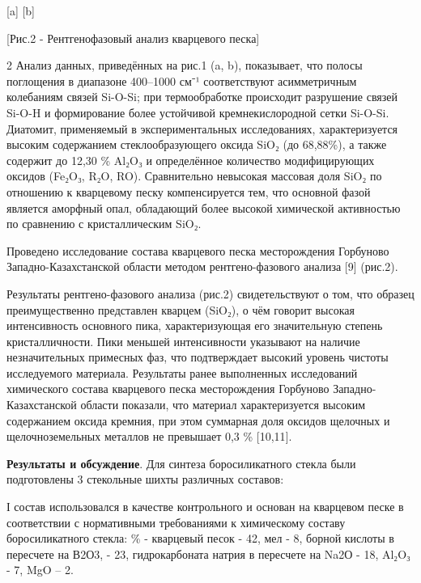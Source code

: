 \begin{figs}
    [a]
    [b]
\end{figs}
[Рис.2 - Рентгенофазовый анализ кварцевого песка]

\begin{multicols}{2}
Анализ данных, приведённых на рис.1 (a, b), показывает, что полосы
поглощения в диапазоне 400--1000 см⁻¹ соответствуют асимметричным
колебаниям связей Si-O-Si; при термообработке происходит разрушение
связей Si-O-H и формирование более устойчивой кремнекислородной сетки
Si-O-Si. Диатомит, применяемый в экспериментальных исследованиях,
характеризуется высоким содержанием стеклообразующего оксида SiO₂ (до
68,88\%), а также содержит до 12,30 \% Al₂O₃ и определённое количество
модифицирующих оксидов (Fe₂O₃, R₂O, RO). Сравнительно невысокая массовая
доля SiO₂ по отношению к кварцевому песку компенсируется тем, что
основной фазой является аморфный опал, обладающий более высокой
химической активностью по сравнению с кристаллическим SiO₂.

Проведено исследование состава кварцевого песка месторождения Горбуново
Западно-Казахстанской области методом рентгено-фазового анализа {[}9{]}
(рис.2).

Результаты рентгено-фазового анализа (рис.2) свидетельствуют о том, что
образец преимущественно представлен кварцем (SiO₂), о чём говорит
высокая интенсивность основного пика, характеризующая его значительную
степень кристалличности. Пики меньшей интенсивности указывают на наличие
незначительных примесных фаз, что подтверждает высокий уровень чистоты
исследуемого материала. Результаты ранее выполненных исследований
химического состава кварцевого песка месторождения Горбуново
Западно-Казахстанской области показали, что материал характеризуется
высоким содержанием оксида кремния, при этом суммарная доля оксидов
щелочных и щелочноземельных металлов не превышает 0,3 \% {[}10,11{]}.

{\bfseries Результаты и обсуждение}. Для синтеза боросиликатного стекла
были подготовлены 3 стекольные шихты различных составов:

І состав использовался в качестве контрольного и основан на кварцевом
песке в соответствии с нормативными требованиями к химическому составу
боросиликатного стекла: \% - кварцевый песок - 42, мел - 8, борной
кислоты в пересчете на В2О3, - 23, гидрокарбоната натрия в пересчете на
Na2О - 18, Al₂O₃ - 7, MgO -- 2.


\end{multicols}
